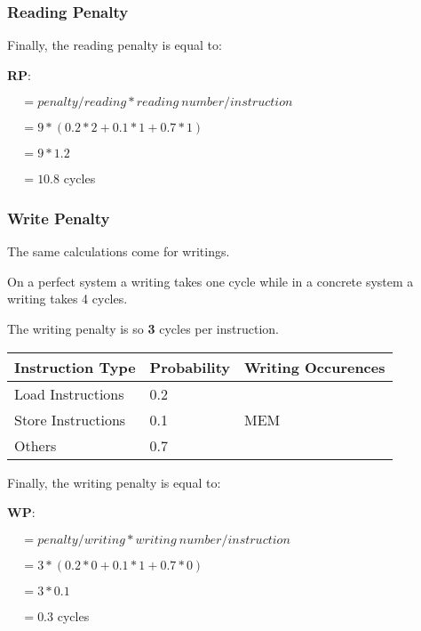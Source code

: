 \begin{frame}
  \frametitle{Reading Penalty}

  Finally, the reading penalty is equal to:

  \nl

  \textbf{RP}:

  $~~~~~= penalty / reading * reading~number / instruction$

  $~~~~~= 9 * (0.2 * 2 + 0.1 * 1 + 0.7 * 1)$

  $~~~~~= 9 * 1.2$

  $~~~~~= 10.8$ cycles
\end{frame}


\begin{frame}
  \frametitle{Write Penalty}

  The same calculations come for writings.

  \nl

  On a perfect system a writing takes one cycle while in a concrete system
  a writing takes 4 cycles.

  \nl

  The writing penalty is so \textbf{3} cycles per instruction.

  \begin{tabular}{|p{3cm}|p{3cm}|p{3cm}|}
    \hline

    \textbf{Instruction Type} & \textbf{Probability} &
    \textbf{Writing Occurences} \\

    \hline

    Load Instructions & 0.2 & \\

    \hline

    Store Instructions & 0.1 & MEM \\

    \hline

    Others & 0.7 & \\

    \hline
  \end{tabular}

  Finally, the writing penalty is equal to:

  \nl

  \textbf{WP}:

  $~~~~~= penalty / writing * writing~number / instruction$

  $~~~~~= 3 * (0.2 * 0 + 0.1 * 1 + 0.7 * 0)$

  $~~~~~= 3 * 0.1$

  $~~~~~= 0.3$ cycles
\end{frame}

